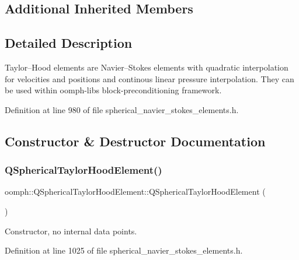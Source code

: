 \subsection*{Additional Inherited Members}


\subsection{Detailed Description}
Taylor--Hood elements are Navier--Stokes elements with quadratic interpolation for velocities and positions and continous linear pressure interpolation. They can be used within oomph-\/lib\textquotesingle{}s block-\/preconditioning framework. 

Definition at line 980 of file spherical\+\_\+navier\+\_\+stokes\+\_\+elements.\+h.



\subsection{Constructor \& Destructor Documentation}
\mbox{\label{classoomph_1_1QSphericalTaylorHoodElement_a03608ea537e37018e0894260ebc83b65}} 
\subsubsection{\texorpdfstring{Q\+Spherical\+Taylor\+Hood\+Element()}{QSphericalTaylorHoodElement()}}
{\footnotesize\ttfamily oomph\+::\+Q\+Spherical\+Taylor\+Hood\+Element\+::\+Q\+Spherical\+Taylor\+Hood\+Element (\begin{DoxyParamCaption}{ }\end{DoxyParamCaption})\hspace{0.3cm}{\ttfamily [inline]}}



Constructor, no internal data points. 



Definition at line 1025 of file spherical\+\_\+navier\+\_\+stokes\+\_\+elements.\+h.



